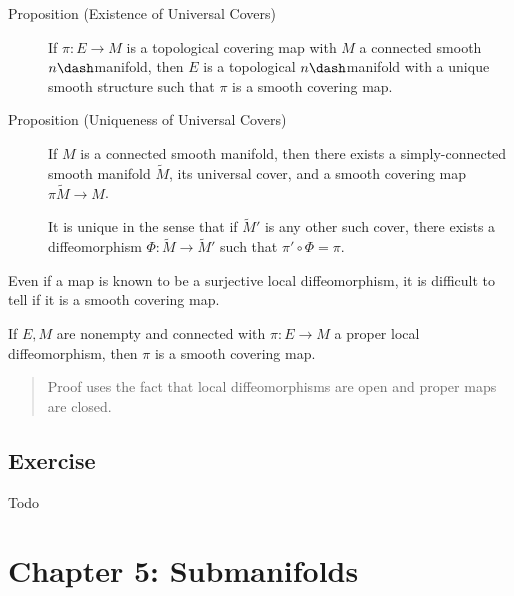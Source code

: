 \begin{description}
\item[Proposition (Existence of Universal Covers)]
If \(\pi:E\to M\) is a topological covering map with \(M\) a connected
smooth \(n\dash\)manifold, then \(E\) is a topological
\(n\dash\)manifold with a unique smooth structure such that \(\pi\) is a
smooth covering map.
\item[Proposition (Uniqueness of Universal Covers)]
If \(M\) is a connected smooth manifold, then there exists a
simply-connected smooth manifold \(\tilde M\), its universal cover, and
a smooth covering map \(\pi \tilde M\to M\).

It is unique in the sense that if \(\tilde M'\) is any other such cover,
there exists a diffeomorphism \(\Phi: \tilde M \to \tilde M'\) such that
\(\pi' \circ \Phi = \pi\).
\end{description}

\begin{center}
\end{center}

Even if a map is known to be a surjective local diffeomorphism, it is
difficult to tell if it is a smooth covering map.

\begin{description}
\tightlist
\item[Proposition (Sufficient Condition for Local Diffeomorphisms to be
Coverings)]
If \(E, M\) are nonempty and connected with \(\pi:E\to M\) a proper
local diffeomorphism, then \(\pi\) is a smooth covering map.
\end{description}

\begin{quote}
Proof uses the fact that local diffeomorphisms are open and proper maps
are closed.
\end{quote}

\hypertarget{exercise}{%
\subsection{Exercise}\label{exercise}}

Todo

\hypertarget{chapter-5-submanifolds}{%
\section{Chapter 5: Submanifolds}\label{chapter-5-submanifolds}}

